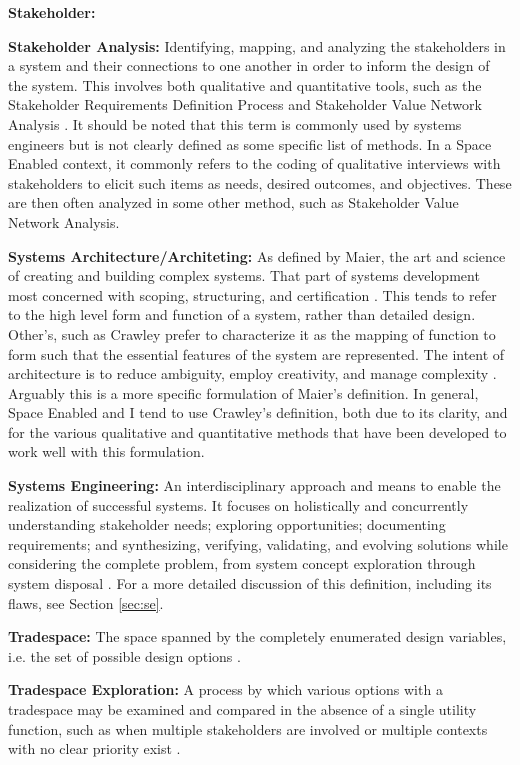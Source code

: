 \textbf{Stakeholder:} 

\textbf{Stakeholder Analysis:} Identifying, mapping, and analyzing the stakeholders in a system and their connections to one another in order to inform the design of the system. This involves both qualitative and quantitative tools, such as the Stakeholder Requirements Definition Process \cite{incoseINCOSESystemsEngineering2015} and Stakeholder Value Network Analysis \cite{fengDependencyStructureMatrix2010a}. It should be noted that this term is commonly used by systems engineers but is not clearly defined as some specific list of methods. In a Space Enabled context, it commonly refers to the coding of qualitative interviews with stakeholders to elicit such items as needs, desired outcomes, and objectives. These are then often analyzed in some other method, such as Stakeholder Value Network Analysis.

\textbf{Systems Architecture/Architeting:} As defined by Maier, the art and science of creating and building complex systems. That part of systems development most concerned with scoping, structuring, and certification \cite{maierArtSystemsArchitecting2009}. This tends to refer to the high level form and function of a system, rather than detailed design. Other's, such as Crawley prefer to characterize it as the mapping of function to form such that the essential features of the system are represented. The intent of architecture is to reduce ambiguity, employ creativity, and manage complexity \cite{crawleySystemArchitectureStrategy2015}. Arguably this is a more specific formulation of Maier's definition. In general, Space Enabled and I tend to use Crawley's definition, both due to its clarity, and for the various qualitative and quantitative methods that have been developed to work well with this formulation.

\textbf{Systems Engineering:} An interdisciplinary approach and means to enable the realization of successful systems. It focuses on holistically and concurrently understanding stakeholder needs; exploring opportunities; documenting requirements; and synthesizing, verifying, validating, and evolving solutions while considering the complete problem, from system concept exploration through system disposal \cite{systemsengineeringbodyofknowledgeSystemsEngineeringGlossary2021}. 
For a more detailed discussion of this definition, including its flaws, see Section \ref{sec:se}.

\textbf{Tradespace:}  The space spanned by the completely enumerated design variables, i.e. the set of possible design options \cite{rossTradespaceExplorationParadigm2005}.

\textbf{Tradespace Exploration:} A process by which various options with a tradespace may be examined and compared in the absence of a single utility function, such as when multiple stakeholders are involved or multiple contexts with no clear priority exist \cite{rossTradespaceExplorationParadigm2005}.

\clearpage
\newpage
